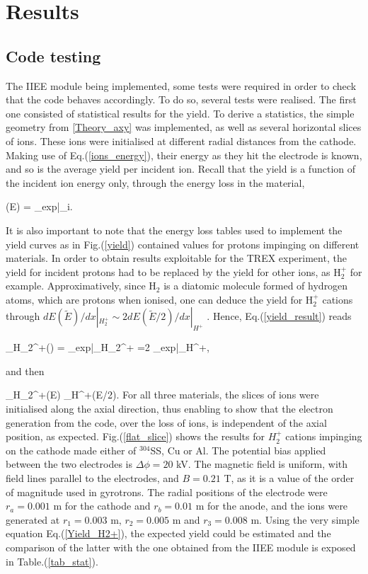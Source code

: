 \section{Results}\label{results}

\subsection{Code testing}

The IIEE module being implemented, some tests were required in order to check that the code behaves accordingly. To do so, several tests were realised. The first one consisted of statistical results for the yield. To derive a statistics, the simple geometry from \ref{Theory_axy} was implemented, as well as several horizontal slices of ions. These ions were initialised at different radial distances from the cathode. Making use of Eq.(\ref{ions_energy}), their energy as they hit the electrode is known, and so is the average yield per incident ion. Recall that the yield is a function of the incident ion energy only, through the energy loss in the material,

\beq
\gamma(E) = \Lambda_{exp}\cdot {}\Bigg|_i.\label{yield_result}
\eeq 

\noindent It is also important to note that the energy loss tables used to implement the yield curves as in Fig.(\ref{yield}) contained values for protons impinging on different materials. In order to obtain results exploitable for the TREX experiment, the yield for incident protons had to be replaced by the yield for other ions, as H$_2^{+}$ for example. Approximatively, since H$_{2}$ is a diatomic molecule formed of hydrogen atoms, which are protons when ionised, one can deduce the yield for H$_2^{+}$ cations through $dE(\tilde{E})/dx|_{H_2^{+}} \sim 2dE(\tilde{E}/2)/dx|_{H^{+}}$ \cite{Yield_H2}. Hence, Eq.(\ref{yield_result}) reads 

\beq
\gamma_{H_2^+}() = \Lambda_{exp}\cdot {}\Bigg|_{H_2^+} =2 \Lambda_{exp}\cdot {}\Bigg|_{H^+},
\eeq  

and then 

\beq
\gamma_{H_2^+}(E) \cdot \gamma_{H^+}(E/2). \label{Yield_H2+}
\eeq
\noindent For all three materials, the slices of ions were initialised along the axial direction, thus enabling to show that the electron generation from the code, over the loss of ions, is independent of the axial position, as expected. Fig.(\ref{flat_slice}) shows the results for $H_2^{+}$ cations impinging on the cathode made either of $^{304}$SS, Cu or Al. The potential bias applied between the two electrodes is $\Delta \phi=20$ kV. The magnetic field is uniform, with field lines parallel to the electrodes, and $B=0.21$ T, as it is a value of the order of magnitude used in gyrotrons. The radial positions of the electrode were $r_a=0.001$ m for the cathode and $r_b=0.01$ m for the anode, and the ions were generated at $r_1 = 0.003$ m, $r_2=0.005$ m and $r_3=0.008$ m. Using the very simple equation Eq.(\ref{Yield_H2+}), the expected yield could be estimated and the comparison of the latter with the one obtained from the IIEE module is exposed in Table.(\ref{tab_stat}). 


